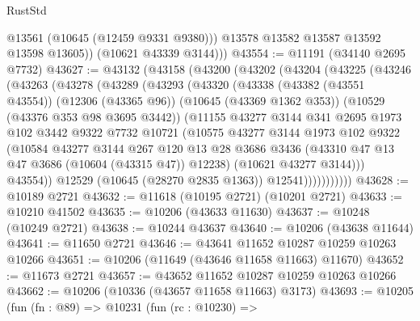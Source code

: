 \begin{lexlean}{RustStd}
\begin{coremodule}
              @13561
              (@10645 (@12459 @9331 @9380)))
            @13578
            @13582
            @13587
            @13592
            @13598
            @13605))
        (@10621 @43339 @3144)))
@43554 := @11191 (@34140 @2695 @7732)
@43627 := @43132
    (@43158
      (@43200
        (@43202
          (@43204
            (@43225
              (@43246
                (@43263
                  (@43278
                    (@43289
                      (@43293
                        (@43320
                          (@43338
                            (@43382 (@43551 @43554))
                            (@12306 (@43365 @96))
                            (@10645 (@43369 @1362 @353))
                            (@10529 (@43376 @353 @98 @3695 @3442))
                            (@11155
                              @43277
                              @3144
                              @341
                              @2695
                              @1973
                              @102
                              @3442
                              @9322
                              @7732
                              @10721
                              (@10575
                                @43277
                                @3144
                                @1973
                                @102
                                @9322
                                (@10584
                                  @43277
                                  @3144
                                  @267
                                  @120
                                  @13
                                  @28
                                  @3686
                                  @3436
                                  (@43310 @47 @13 @47 @3686 (@10604 (@43315 @47)) @12238)
                                  (@10621 @43277 @3144)))
                              @43554))
                          @12529
                          (@10645 (@28270 @2835 @1363))
                          @12541)))))))))))
@43628 := @10189 @2721
@43632 := @11618 (@10195 @2721) (@10201 @2721)
@43633 := @10210 @41502
@43635 := @10206 (@43633 @11630)
@43637 := @10248 (@10249 @2721)
@43638 := @10244 @43637
@43640 := @10206 (@43638 @11644)
@43641 := @11650 @2721
@43646 := @43641 @11652 @10287 @10259 @10263 @10266
@43651 := @10206 (@11649 (@43646 @11658 @11663) @11670)
@43652 := @11673 @2721
@43657 := @43652 @11652 @10287 @10259 @10263 @10266
@43662 := @10206 (@10336 (@43657 @11658 @11663) @3173)
@43693 := @10205
    (fun (fn : @89) =>
    @10231
      (fun (rc : @10230) =>

\end{coremodule}
\end{lexlean}
